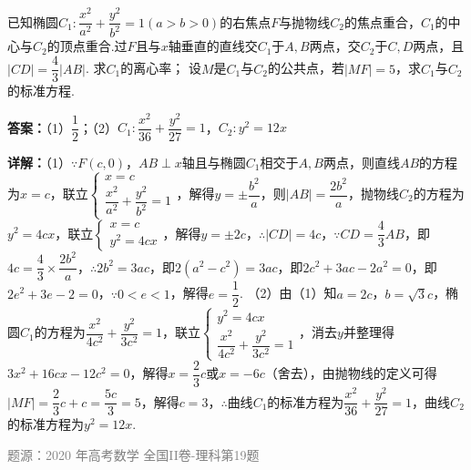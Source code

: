 \begin{question}
已知椭圆$C_1:\dfrac{x^2}{a^2}+\dfrac{y^2}{b^2}=1(a>b>0)$的右焦点$F$与抛物线$C_2$的焦点重合，$C_1$的中心与$C_2$的顶点重合.过$F$且与$x$轴垂直的直线交$C_1$于$A,B$两点，交$C_2$于$C,D$两点，且$|CD|=\dfrac43|AB|$.
求$C_1$的离心率；
设$M$是$C_1$与$C_2$的公共点，若$|MF|=5$，求$C_1$与$C_2$的标准方程.
\begin{solution}
\textbf{答案：}（1）$\dfrac12$；（2）$C_1:\dfrac{x^2}{36}+\dfrac{y^2}{27}=1$，$C_2:y^2=12x$

\textbf{详解：}（1）$\because F(c,0)$，$AB\perp x$轴且与椭圆$C_1$相交于$A,B$两点，则直线$AB$的方程为$x=c$，联立$\begin{cases}x=c\\\dfrac{x^2}{a^2}+\dfrac{y^2}{b^2}=1\end{cases}$，解得$y=\pm\dfrac{b^2}{a}$，则$|AB|=\dfrac{2b^2}{a}$，抛物线$C_2$的方程为$y^2=4cx$，联立$\begin{cases}x=c\\y^2=4cx\end{cases}$，解得$y=\pm2c$，$\therefore |CD|=4c$，$\because CD=\dfrac43AB$，即$4c=\dfrac43\times\dfrac{2b^2}{a}$，$\therefore 2b^2=3ac$，即$2(a^2-c^2)=3ac$，即$2c^2+3ac-2a^2=0$，即$2e^2+3e-2=0$，$\because 0<e<1$，解得$e=\dfrac12$.
（2）由（1）知$a=2c$，$b=\sqrt3c$，椭圆$C_1$的方程为$\dfrac{x^2}{4c^2}+\dfrac{y^2}{3c^2}=1$，联立$\begin{cases}y^2=4cx\\\dfrac{x^2}{4c^2}+\dfrac{y^2}{3c^2}=1\end{cases}$，消去$y$并整理得$3x^2+16cx-12c^2=0$，解得$x=\dfrac23c$或$x=-6c$（舍去），由抛物线的定义可得$|MF|=\dfrac23c+c=\dfrac{5c}{3}=5$，解得$c=3$，$\therefore$曲线$C_1$的标准方程为$\dfrac{x^2}{36}+\dfrac{y^2}{27}=1$，曲线$C_2$的标准方程为$y^2=12x$.

\textcolor{gray}{\footnotesize 题源：2020 年高考数学 全国II卷-理科第19题}
\end{solution}
\end{question}


